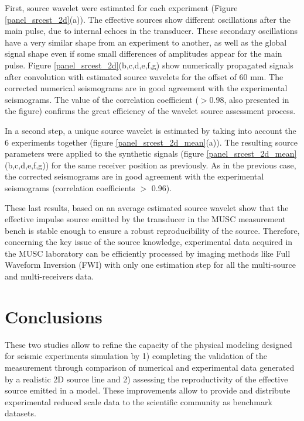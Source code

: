 \documentclass[manuscript,revised]{geophysics}
\begin{document}
\noindent First, source wavelet were estimated for each experiment (Figure \ref{panel_srcest_2d}(a)). The effective sources show different oscillations after the main pulse, due to internal echoes in the transducer. These secondary oscillations have a very similar shape from an experiment to another, as well as the global signal shape even if some small differences of amplitudes appear for the main pulse. Figure \ref{panel_srcest_2d}(b,c,d,e,f,g) show numerically propagated signals after convolution with estimated source wavelets for the offset of 60 mm. The corrected numerical seismograms are in good agreement with the experimental seismograms. The value of the correlation coefficient ($> 0.98$, also presented in the figure) confirms the great efficiency of the wavelet source assessment process.

\noindent In a second step, a unique source wavelet is estimated by taking into account the 6 experiments together (figure \ref{panel_srcest_2d_mean}(a)). The resulting source parameters were applied to the synthetic signals (figure \ref{panel_srcest_2d_mean}(b,c,d,e,f,g)) for the same receiver position as previously. As in the previous case, the corrected seismograms are in good agreement with the experimental seismograms (correlation coefficients $\mathrm{>}$ 0.96).  

\noindent These last results, based on an average estimated source wavelet show that the effective impulse source emitted by the transducer in the MUSC measurement bench is stable enough to ensure a robust reproducibility of the source. Therefore, concerning the key issue of the source knowledge, experimental data acquired in the MUSC laboratory can be efficiently processed by imaging methods like Full Waveform Inversion (FWI) with only one estimation step for all the multi-source and multi-receivers data.


\section{Conclusions}

\noindent These two studies allow to refine the capacity of the physical modeling designed for seismic experiments simulation by 1) completing the validation of the measurement through comparison of numerical and experimental data generated by a realistic 2D source line and 2) assessing the reproductivity of the effective source emitted in a model. These improvements allow to provide and distribute experimental reduced scale data to the scientific community as benchmark datasets.
\end{document}
